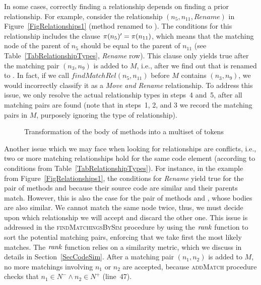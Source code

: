 In some cases, correctly finding a relationship depends on finding a prior relationship.
For example, consider the relationship $(n_5, n_{11}, Rename)$ in Figure~\ref{FigRelationships1} (method  renamed to ).
The conditions for this relationship includes the clause $\operatorname{\pi}(n_5)' = \operatorname{\pi}(n_{11})$, which means that the matching node of the parent of $n_5$ should be equal to the parent of $n_{11}$ (see Table~\ref{TabRelationshipTypes}, \textit{Rename} row).
This clause only yields true after the matching pair $(n_3, n_9)$ is added to $M$, i.e., after we find out that  is renamed to .
In fact, if we call $\mathit{findMatchRel}(n_5, n_{11})$ before $M$ contains $(n_3, n_9)$, we would incorrectly classify it as a \textit{Move and Rename} relationship.
To address this issue, we only resolve the actual relationship types in steps~4 and~5, after all matching pairs are found (note that in steps~1, 2, and 3 we record the matching pairs in $M$, purposely ignoring the type of relationship).


\begin{figure}[htb]
\renewcommand{\arraystretch}{1.3}
\centering
\footnotesize

\caption{Transformation of the body of methods into a multiset of tokens}
\label{FigSourceCodeTransformation}
\end{figure}



Another issue which we may face when looking for relationships are conflicts, i.e., two or more matching relationships hold for the same code element (according to conditions from Table~\ref{TabRelationshipTypes}).
For instance, in the example from Figure~\ref{FigRelationships1}, the conditions for \textit{Rename} yield true for the pair of methods  and  because their source code are similar and their parents match.
However, this is also the case for the pair of methods  and , whose bodies are also similar.
We cannot match the same node twice, thus, we must decide upon which relationship we will accept and discard the other one.
This issue is addressed in the \textsc{findMatchingsBySim} procedure by using the $\operatorname{\mathit{rank}}$ function to sort the potential matching pairs, enforcing that we take first the most likely matches.
The $\operatorname{\mathit{rank}}$ function relies on a similarity metric, which we discuss in details in Section~\ref{SecCodeSim}.
After a matching pair $(n_1, n_2)$ is added to $M$, no more matchings involving $n_1$ or $n_2$ are accepted, because \textsc{addMatch} procedure checks that $n_1 \in N^- \land n_2 \in N^+$ (line~47).







